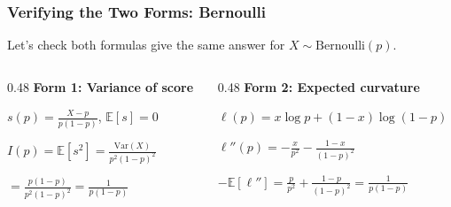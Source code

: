 \documentclass[aspectratio=169]{beamer}
\begin{document}
\begin{frame}
\frametitle{Verifying the Two Forms: Bernoulli}

\small
Let's check both formulas give the same answer for $X \sim \text{Bernoulli}(p)$.

\vspace{0.15cm}
\begin{columns}[T]
\begin{column}{0.48\textwidth}
\textcolor{popblue}{\textbf{Form 1: Variance of score}}

\vspace{0.1cm}
$s(p) = \frac{X - p}{p(1-p)}$, \quad$\mathbb{E}[s] = 0$

\vspace{0.1cm}
$I(p) = \mathbb{E}[s^2] = \frac{\text{Var}(X)}{p^2(1{-}p)^2}$

\vspace{0.1cm}
$= \frac{p(1{-}p)}{p^2(1{-}p)^2} = \boxed{\frac{1}{p(1{-}p)}}$
\end{column}
\begin{column}{0.48\textwidth}
\textcolor{sampred}{\textbf{Form 2: Expected curvature}}

\vspace{0.1cm}
$\ell(p) = x\log p + (1{-}x)\log(1{-}p)$

\vspace{0.1cm}
$\ell''(p) = -\frac{x}{p^2} - \frac{1-x}{(1-p)^2}$

\vspace{0.1cm}
$-\mathbb{E}[\ell''] = \frac{p}{p^2} + \frac{1-p}{(1-p)^2} = \boxed{\frac{1}{p(1{-}p)}}$
\end{column}
\end{columns}

\vspace{0.3cm}
\begin{center}
\end{center}
\end{frame}
\end{document}
